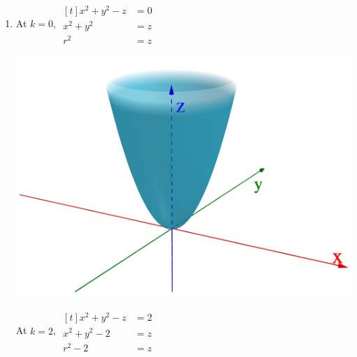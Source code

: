 \begin{enumerate}
\begin{center}
    \end{center}

    \item 
    \begin{minipage}[t]{0.45\linewidth}
        At $k = 0$, 
        $\begin{aligned}[t]
            x^2 + y^2 - z &= 0 \\
            x^2 + y^2     &= z \\
            r^2           &= z
        \end{aligned}$
        
        \begin{center} \includegraphics[width=\linewidth]{Plots/e_1_7/1.png} \end{center}
    \end{minipage}
    \begin{minipage}[t]{0.45\linewidth}
        At $k = 2$, 
        $\begin{aligned}[t]
            x^2 + y^2 - z &= 2 \\
            x^2 + y^2 - 2 &= z \\
            r^2 - 2       &= z
        \end{aligned}$


\end{minipage}
\end{enumerate}
